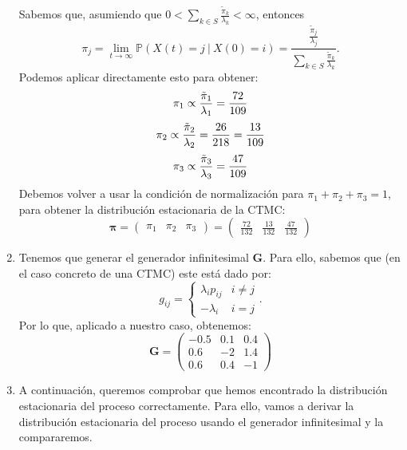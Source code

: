 \documentclass[a4paper]{article}
\begin{document}
\begin{enumerate}[label=(\alph*)]
        Sabemos que, asumiendo que $0 < \sum_{k \in S} \frac{\tilde \pi_{k}}{\lambda_{k}} < \infty$, entonces
        \begin{equation}\label{stationary:ctmc}
\pi_{j} = \lim_{t \to \infty} \mathbb P(X(t) = j \ | \ X(0) = i) = \frac{ \frac{\tilde \pi_{j}}{\lambda_{j}} }{\sum_{k \in S}\frac{\tilde \pi_{k}}{\lambda_{k}}}.
        \end{equation}
        Podemos aplicar directamente esto para obtener:
        \[
\pi_1 \propto \frac{\tilde \pi_1}{\lambda_1} = \frac{72}{109} \\
\]
\[
\pi_2 \propto \frac{\tilde \pi_2}{\lambda_2} = \frac{26}{218} = \frac{13}{109}  \\
\]
\[
\pi_3 \propto \frac{\tilde \pi_3}{\lambda_3} = \frac{47}{109} \\
        \]
        Debemos volver a usar la condición de normalización para $\pi_1 + \pi_2 + \pi_3 = 1$, para obtener la distribución estacionaria de la CTMC:
        \[
        \mathbf{\pi} = \begin{pmatrix} \pi_1 &  \pi_2 &  \pi_3 \end{pmatrix}  =
        \begin{pmatrix}
          \frac{72}{132} & \frac{13}{132}&\frac{47}{132}
        \end{pmatrix}
        \]



  \item Tenemos que generar el generador infinitesimal $\mathbf G$. Para ello, sabemos que (en el caso concreto de una CTMC) este está dado por:
        \[
g_{ij} =
\begin{cases}
\lambda_i p_{ij} & i \neq j\\
-\lambda _i & i = j
\end{cases}.
        \]
        Por lo que, aplicado a nuestro caso, obtenemos:
        \[
        \mathbf{G} = \begin{pmatrix}
          -0.5 & 0.1 & 0.4 \\
          0.6 & -2 & 1.4 \\
          0.6 & 0.4 & -1
        \end{pmatrix}
        \]

  \item A continuación, queremos comprobar que hemos encontrado la distribución estacionaria del proceso correctamente. Para ello, vamos a derivar la distribución estacionaria del proceso usando el generador infinitesimal y la compararemos.


\end{enumerate}
\end{document}
